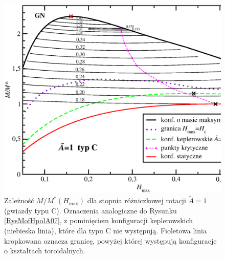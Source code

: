 \documentclass{bachelor_thesis}
\begin{document}
            \begin{figure}[h!]
            \centering
            \includegraphics[scale=.47]{figures/RysMofHpolA1.eps}
            \caption{Zależność $M/M^*(H_{\textrm{max}})$ dla stopnia różniczkowej rotacji $\tilde{A}=1$ (gwiazdy typu C). Oznaczenia analogiczne do Rysunku \ref{RysMofHpolA07}, z pominięciem konfiguracji keplerowskich (niebieska linia), które dla typu C nie występują. Fioletowa linia kropkowana oznacza granicę, powyżej której występują konfiguracje o kształtach toroidalnych.}
            \label{RysMofHpolA1}
            \end{figure}
\end{document}
